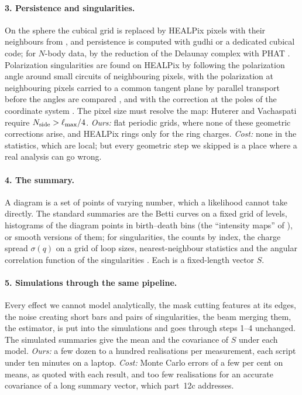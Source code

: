 \paragraph{3. Persistence and singularities.} On the sphere the cubical grid is replaced by HEALPix pixels with their
neighbours from , and persistence is computed with gudhi or a dedicated cubical code;
for $N$-body data, by the reduction of the Delaunay complex with PHAT \cite{Pranav2017,Wilding2021}. Polarization
singularities are found on HEALPix by following the polarization angle around small circuits of neighbouring pixels,
with the polarization at neighbouring pixels carried to a common tangent plane by parallel transport before the angles
are compared \cite{VachaspatiLue2003}, and with the correction at the poles of the coordinate system
\cite{HutererVachaspati2005}. The pixel size must resolve the map: Huterer and Vachaspati require
$N_{\rm side}>\ell_{\max}/4$. \emph{Ours:} flat periodic grids, where none of these geometric corrections arise, and
HEALPix rings only for the ring charges. \emph{Cost:} none in the statistics, which are local; but every geometric step we
skipped is a place where a real analysis can go wrong.

\paragraph{4. The summary.} A diagram is a set of points of varying number, which a likelihood cannot take directly. The
standard summaries are the Betti curves on a fixed grid of levels, histograms of the diagram points in birth--death bins
(the ``intensity maps'' of \cite{Pranav2017}), or smooth versions of them; for singularities, the counts by index, the
charge spread $\sigma(q)$ on a grid of loop sizes, nearest-neighbour statistics and the angular correlation function of
the singularities \cite{HutererVachaspati2005}. Each is a fixed-length vector $S$.

\paragraph{5. Simulations through the same pipeline.} Every effect we cannot model analytically, the mask cutting
features at its edges, the noise creating short bars and pairs of singularities, the beam merging them, the estimator,
is put into the simulations and goes through steps 1--4 unchanged. The simulated summaries give the mean and the
covariance of $S$ under each model. \emph{Ours:} a few dozen to a hundred realisations per measurement, each script under
ten minutes on a laptop. \emph{Cost:} Monte Carlo errors of a few per cent on means, as quoted with each result, and too
few realisations for an accurate covariance of a long summary vector, which part~12c addresses.

